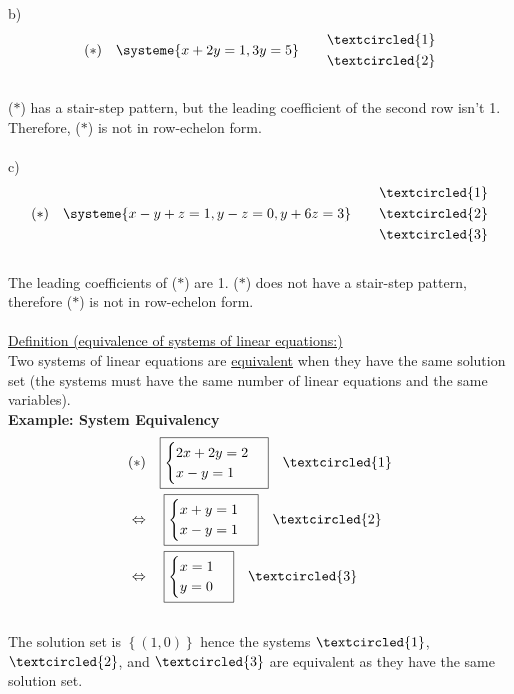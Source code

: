 \documentclass{jhwhw}
\begin{document}
b) \begin{align*} 
(\ast) \quad \systeme{x+2y=1,3y=5} \quad \quad \begin{aligned} &\textcircled{1} \\ &\textcircled{2}\end{aligned}
\end{align*}
\\
(\(\ast\)) has a stair-step pattern, but the leading coefficient of the second row isn't 1. Therefore, (\(\ast\)) is not in row-echelon form.
\\ \\

c) \begin{align*} 
(\ast) \quad \systeme{x-y+z=1,y-z=0,y+6z=3} \quad \quad \begin{aligned} &\textcircled{1} \\ &\textcircled{2} \\ &\textcircled{3} \end{aligned}
\end{align*}
\\
The leading coefficients of (\(\ast\)) are 1. (\(\ast\)) does not have a stair-step pattern, therefore (\(\ast\)) is not in row-echelon form.
\\ \\

\underline{Definition (equivalence of systems of linear equations:)}
\\

Two systems of linear equations are \underline{equivalent} when they have the same solution set (the systems must have the same number of linear equations and the same variables).
\\

\textbf{Example: System Equivalency}
\\
\begin{align*} 
&(\ast) \quad \boxed{\begin{cases} 2x+2y=2 \\ x-y=1 \end{cases}} \quad \textcircled{1}\\
&\Leftrightarrow \quad \boxed{\begin{cases} x+y=1 \\ x-y=1 \end{cases}} \quad \textcircled{2}\\
&\Leftrightarrow \quad \boxed{\begin{cases} x=1 \\ y=0 \end{cases}} \quad \textcircled{3}
\end{align*}
\\
The solution set is \(\left\{(1,0)\right\}\) hence the systems \(\textcircled{1}\), \(\textcircled{2}\), and \(\textcircled{3}\) are equivalent as they have the same solution set.
\\
\end{document}

